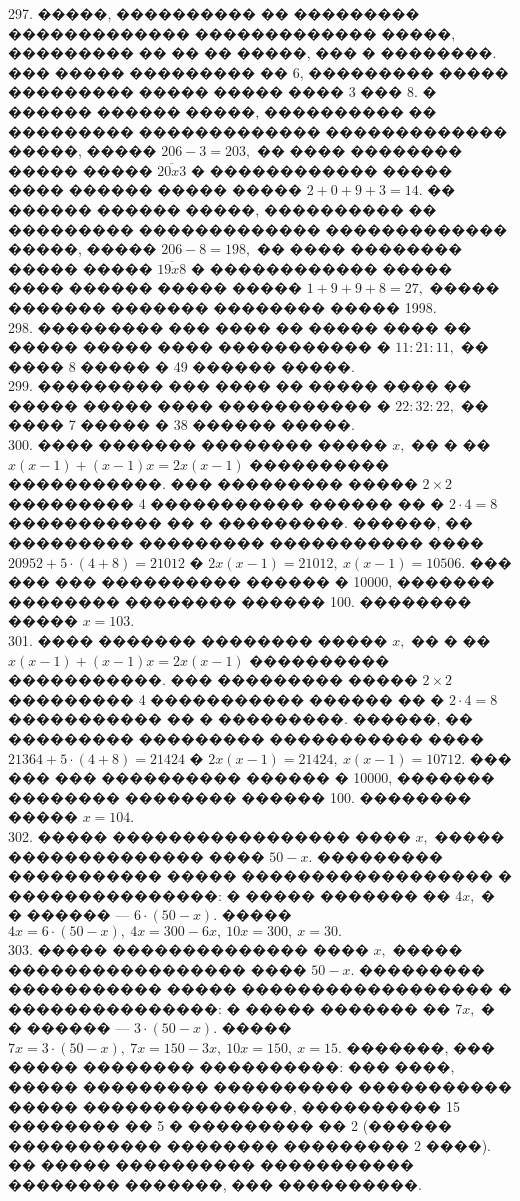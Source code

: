 \documentclass[12pt]{article}
\begin{document}
297. �����, ���������� �� ��������� ������������� ������������� �����, ��������� �� �� �� �����, ��� � ��������. ��� ����� ��������� �� 6, ��������� ����� ��������� ����� ����� ���� 3 ��� 8. � ������ ������ �����, ���������� �� ��������� ������������� ������������� �����, ����� $206-3=203,$ �� ���� �������� ����� ����� $\overline{20x3}$ � ������������ ����� ���� ������ ����� ����� $2+0+9+3=14.$ �� ������ ������ �����, ���������� �� ��������� ������������� ������������� �����, ����� $206-8=198,$ �� ���� �������� ����� ����� $\overline{19x8}$ � ������������ ����� ���� ������ ����� ����� $1+9+9+8=27,$ ����� ������� ������� �������� ����� 1998.\\
298. ��������� ��� ���� �� ����� ���� �� ����� ����� ���� ����������� � $11:21:11,$ �� ���� 8 ����� � 49 ������ �����.\\
299. ��������� ��� ���� �� ����� ���� �� ����� ����� ���� ����������� � $22:32:22,$ �� ���� 7 ����� � 38 ������ �����.\\
300. ���� ������� �������� ����� $x,$ �� � �� $x(x-1)+(x-1)x=2x(x-1)$ ���������� �����������. ��� ��������� ����� $2\times2$ ��������� 4 ����������� ������ �� � $2\cdot4=8$ ����������� �� � ���������. ������, �� ��������� ��������� ����������� ���� $20952+5\cdot(4+8)=21012$ � $2x(x-1)=21012,\ x(x-1)=10506.$ ��� ��� ��� ���������� ������ � 10000, ������� �������� �������� ������ 100. �������� ����� $x=103.$\\
301. ���� ������� �������� ����� $x,$ �� � �� $x(x-1)+(x-1)x=2x(x-1)$ ���������� �����������. ��� ��������� ����� $2\times2$ ��������� 4 ����������� ������ �� � $2\cdot4=8$ ����������� �� � ���������. ������, �� ��������� ��������� ����������� ���� $21364+5\cdot(4+8)=21424$ � $2x(x-1)=21424,\ x(x-1)=10712.$ ��� ��� ��� ���������� ������ � 10000, ������� �������� �������� ������ 100. �������� ����� $x=104.$\\
302. ����� ����������������� ���� $x,$ ����� �������������� ����  $50-x.$ ��������� ����������� ����� ������������������ � ���������������: � ����� ������� �� $4x,$ � � ������ --- $6\cdot(50-x).$ ����� $4x=6\cdot(50-x),\
4x=300-6x,\ 10x=300,\ x=30.$\\
303. ����� �������������� ���� $x,$ ����� ����������������� ����  $50-x.$ ��������� ����������� ����� ������������������ � ���������������: � ����� ������� �� $7x,$ � � ������ --- $3\cdot(50-x).$ ����� $7x=3\cdot(50-x),\
7x=150-3x,\ 10x=150,\ x=15.$ �������, ��� ����� �������� ����������: ��� ����, ����� ��������� ���������� ����������� ����� ���������������, ���������� 15 �������� �� 5 � ��������� �� 2 (������ ����������� �������� ��������� 2 ����). �� ����� ���������� ����������� �������� �������, ��� ����������.\\
\end{document}
